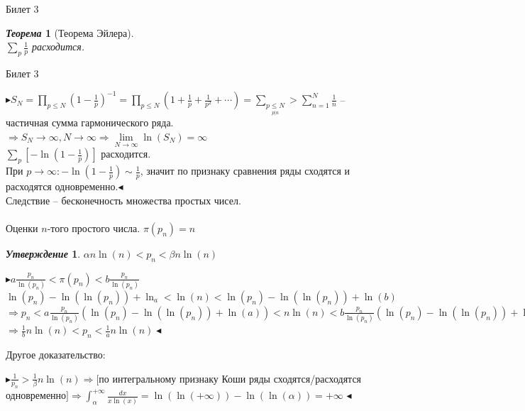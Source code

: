 \documentclass[a4paper,12pt]{article}
\newtheorem{teo}{\textit{Теорема}}
\newtheorem{utv}{\textit{Утверждение}}
\newcommand{\q}{\quad}
\newcommand{\pb}{\blacktriangleright}
\newcommand{\pe}{\blacktriangleleft}
\newcommand{\Ra}{\Rightarrow}
\newcommand{\SL}{\sum\limits}
\newcommand{\os}{\left(}
\newcommand{\cs}{\right)}
\begin{document}
\begin{mybox}{\hypertarget{bil3}{Билет 3}}
\begin{formbox}{}
\begin{teo}[Теорема Эйлера]\q\\$\sum_p \frac{1}{p}$ расходится.
\end{teo}
\end{formbox}
\end{mybox}
\newpage
\begin{mybox}{{Билет 3}}

$\pb S_N = \prod\limits_{p \le N} (1 - \frac{1}{p})^{-1} = \prod\limits_{p \le N} \os 1 + \frac{1}{p} + \frac{1}{p^2} + \cdots\cs = \SL_{\underset{ p|n}{p \le N}} > \SL_{n=1}^N\frac{1}{n}$ -- частичная сумма гармонического ряда.\\
$\Ra S_N\to \infty, N\to\infty\Ra \lim\limits_{N\to\infty}\ln(S_N) = \infty$\\
$\SL_p[-\ln(1-\frac{1}{p})]$ расходится.\\
При $p\to\infty: -\ln(1-\frac{1}{p}) \sim \frac{1}{p}$, значит по признаку сравнения ряды сходятся и расходятся одновременно.$\pe$\\
Следствие -- бесконечность множества простых чисел.\\\q\\

Оценки $n$-того простого числа. $\pi(p_n) = n$\\
\begin{formbox}{}
\begin{utv} $\alpha n \ln(n) < p_n < \beta n \ln(n)   $
\end{utv}
\end{formbox}
$\pb a \frac{p_n}{\ln(p_n)} < \pi(p_n) < b \frac{p_n}{\ln(p_n)} $\\
$\ln(p_n)  -\ln(\ln(p_n)) + \ln_a < \ln(n) < \ln (p_n) - \ln(\ln(p_n)) + \ln(b)  $\\
$\Ra p_n < a \frac{p_n}{\ln(p_n)} (\ln(p_n) - \ln(\ln(p_n)) + \ln(a))   < n \ln(n) <  b \frac{p_n}{\ln(p_n)} (\ln(p_n) - \ln(\ln(p_n)) + \ln(b))$\\$ \Ra \frac{1}{b} n \ln(n) < p_n < \frac{1}{a}n \ln(n)\pe $



Другое доказательство:

$ \pb \frac{1}{p_n} > \frac{1}{\beta}n \ln (n) \Ra [$по интегральному признаку Коши ряды сходятся/расходятся одновременно$] \Ra \int_{\alpha}^{+\infty}\frac{dx}{x \ln(x)} = \ln(\ln(+\infty)) - \ln(\ln(\alpha)) = +\infty $ $\pe$

\end{mybox}
\end{document}
